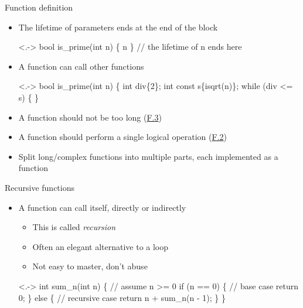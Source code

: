\begin{frame}[fragile]{Function definition}

  \begin{itemize}[<+->]

  \item The lifetime of parameters ends at the end of the block
    
    \begin{codeblock}<.->{
bool is_prime(int n)
\{
  \ddd n \ddd
\} // the lifetime of n ends here}\end{codeblock}

  \item A function can call other functions

    \begin{codeblock}<.->{
bool is_prime(int n)
\{
  \ddd
  int div\{2\};
  int const s\{\alert{isqrt}(n)\};
  while (div <= s) \{
  \ddd
\}}\end{codeblock}

  \item A function should not be too long
    (\href{https://isocpp.github.io/CppCoreGuidelines/CppCoreGuidelines#f3-keep-functions-short-and-simple}{F.3})

  \item A function should perform a single logical operation
    (\href{https://isocpp.github.io/CppCoreGuidelines/CppCoreGuidelines#f2-a-function-should-perform-a-single-logical-operation}{F.2})

  \item Split long/complex functions into multiple parts, each implemented as a
    function
  \end{itemize}

\end{frame}

\begin{frame}[fragile]{Recursive functions}

  \begin{itemize}
  \item A function can call itself, directly or indirectly
    \begin{itemize}[<.->]
    \item This is called \textit{recursion}
    \item Often an elegant alternative to a loop
    \item Not easy to master, don't abuse
    \end{itemize}

    \begin{codeblock}<.->{
int \alert{sum_n}(int n)
\{
  // assume n >= 0
  if (n == 0) \{  // base case
    return 0;
  \} else \{      // recursive case
    return n + \alert{sum_n}(n - 1);
  \}
\}}\end{codeblock}

  \end{itemize}

\end{frame}

